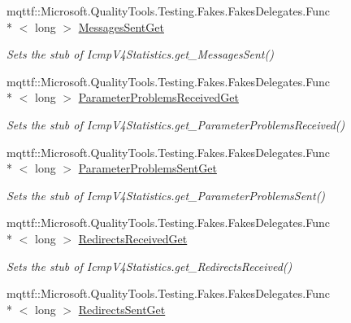 \begin{DoxyCompactItemize}
mqttf\-::\-Microsoft.\-Quality\-Tools.\-Testing.\-Fakes.\-Fakes\-Delegates.\-Func\\*
$<$ long $>$ \hyperlink{class_system_1_1_net_1_1_network_information_1_1_fakes_1_1_stub_icmp_v4_statistics_a604fd75feec4357c52a7714ec51a53bd}{Messages\-Sent\-Get}
\begin{DoxyCompactList}\small\item\em Sets the stub of Icmp\-V4\-Statistics.\-get\-\_\-\-Messages\-Sent()\end{DoxyCompactList}\item 
mqttf\-::\-Microsoft.\-Quality\-Tools.\-Testing.\-Fakes.\-Fakes\-Delegates.\-Func\\*
$<$ long $>$ \hyperlink{class_system_1_1_net_1_1_network_information_1_1_fakes_1_1_stub_icmp_v4_statistics_a0cdce7c10e509dd3b661943ec2b86a1b}{Parameter\-Problems\-Received\-Get}
\begin{DoxyCompactList}\small\item\em Sets the stub of Icmp\-V4\-Statistics.\-get\-\_\-\-Parameter\-Problems\-Received()\end{DoxyCompactList}\item 
mqttf\-::\-Microsoft.\-Quality\-Tools.\-Testing.\-Fakes.\-Fakes\-Delegates.\-Func\\*
$<$ long $>$ \hyperlink{class_system_1_1_net_1_1_network_information_1_1_fakes_1_1_stub_icmp_v4_statistics_a6171c2e5199b2bc2ecbc16eed5bf456f}{Parameter\-Problems\-Sent\-Get}
\begin{DoxyCompactList}\small\item\em Sets the stub of Icmp\-V4\-Statistics.\-get\-\_\-\-Parameter\-Problems\-Sent()\end{DoxyCompactList}\item 
mqttf\-::\-Microsoft.\-Quality\-Tools.\-Testing.\-Fakes.\-Fakes\-Delegates.\-Func\\*
$<$ long $>$ \hyperlink{class_system_1_1_net_1_1_network_information_1_1_fakes_1_1_stub_icmp_v4_statistics_a7e4bef71a382e0670ea668e8abdb50ae}{Redirects\-Received\-Get}
\begin{DoxyCompactList}\small\item\em Sets the stub of Icmp\-V4\-Statistics.\-get\-\_\-\-Redirects\-Received()\end{DoxyCompactList}\item 
mqttf\-::\-Microsoft.\-Quality\-Tools.\-Testing.\-Fakes.\-Fakes\-Delegates.\-Func\\*
$<$ long $>$ \hyperlink{class_system_1_1_net_1_1_network_information_1_1_fakes_1_1_stub_icmp_v4_statistics_a3f2e2d6fbc433ec25dd63fc625761414}{Redirects\-Sent\-Get}

\end{DoxyCompactItemize}
